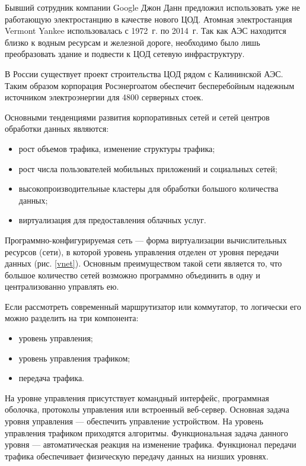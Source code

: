 Бывший сотрудник компании Google Джон Данн предложил использовать уже не работающую электростанцию в качестве нового ЦОД.
Атомная электростанция Vermont Yankee использовалась с 1972~г. по 2014~г.
Так как АЭС находится близко к водным ресурсам и железной дороге, необходимо было лишь преобразовать здание и подвести к ЦОД сетевую инфраструктуру.

В России существует проект строительства ЦОД рядом с Калининской АЭС.
Таким образом корпорация Росэнергоатом обеспечит бесперебойным надежным источником электроэнергии для 4800 серверных стоек.

Основными тенденциями развития корпоративных сетей и сетей центров обработки данных являются:
\begin{itemize}
  \item рост объемов трафика, изменение структуры трафика;
  \item рост числа пользователей мобильных приложений и социальных сетей;
  \item высокопроизводительные кластеры для обработки большого количества данных;
  \item виртуализация для предоставления облачных услуг.
\end{itemize}

Программно-конфигурируемая сеть --- форма виртуализации вычислительных ресурсов (сети), в которой уровень управления отделен от уровня передачи данных (рис. \ref{vnet}).
Основным преимуществом такой сети является то, что большое количество сетей возможно программно объединить в одну и централизованно управлять ею.


Если рассмотреть современный маршрутизатор или коммутатор, то логически его можно разделить на три компонента:
\begin{itemize}
  \item уровень управления;
  \item уровень управления трафиком;
  \item передача трафика.
\end{itemize}

На уровне управления присутствует командный интерфейс, программная оболочка, протоколы управления или встроенный веб-сервер.
Основная задача уровня управления --- обеспечить управление устройством.
На уровень управления трафиком приходятся алгоритмы.
Функциональная задача данного уровня --- автоматическая реакция на изменение трафика.
Функционал передачи трафика обеспечивает физическую передачу данных на низших уровнях.

